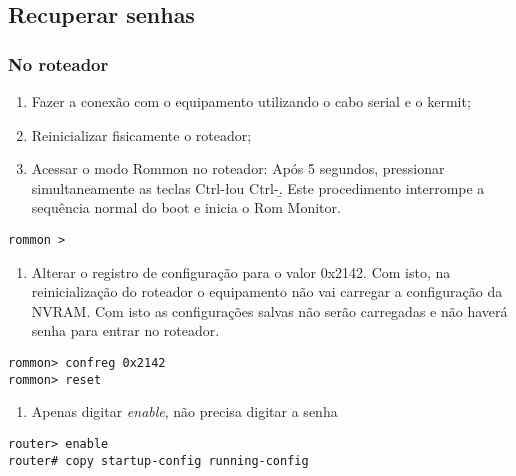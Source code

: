 \documentclass[]{article}
\providecommand{\tightlist}{%
  \setlength{\itemsep}{0pt}\setlength{\parskip}{0pt}}
\begin{document}
\hypertarget{recuperar-senhas}{%
\subsection{Recuperar senhas}\label{recuperar-senhas}}

\hypertarget{no-roteador}{%
\subsubsection{No roteador}\label{no-roteador}}

\begin{enumerate}
\def\labelenumi{\arabic{enumi}.}
\item
  Fazer a conexão com o equipamento utilizando o cabo serial e o kermit;
\item
  Reinicializar fisicamente o roteador;
\item
  Acessar o modo Rommon no roteador: Após 5 segundos, pressionar
  simultaneamente as teclas Ctrl-\l ou Ctrl-\b. Este procedimento
  interrompe a sequência normal do boot e inicia o Rom Monitor.
\end{enumerate}

\begin{verbatim}
rommon >
\end{verbatim}

\begin{enumerate}
\def\labelenumi{\arabic{enumi}.}
\setcounter{enumi}{3}
\tightlist
\item
  Alterar o registro de configuração para o valor 0x2142. Com isto, na
  reinicialização do roteador o equipamento não vai carregar a
  configuração da NVRAM. Com isto as configurações salvas não serão
  carregadas e não haverá senha para entrar no roteador.
\end{enumerate}

\begin{verbatim}
rommon> confreg 0x2142
rommon> reset
\end{verbatim}

\begin{enumerate}
\def\labelenumi{\arabic{enumi}.}
\setcounter{enumi}{4}
\tightlist
\item
  Apenas digitar \emph{enable}, não precisa digitar a senha
\end{enumerate}

\begin{verbatim}
router> enable
router# copy startup-config running-config
\end{verbatim}
\end{document}
